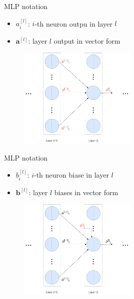\documentclass[compress,oilve,t]{beamer}
\begin{document}
\begin{frame}{MLP notation}
	\begin{itemize}
		\item $a^{[l]}_i$: $i$-th neuron outpu in layer $l$
		\item $\bm{a}^{[l]}$: layer $l$ output in vector form
	\end{itemize}
	\begin{figure}[H]
		\centering
		\includegraphics[width=0.5\textwidth]{Figs/notation1.png}
	\end{figure}
\end{frame}

\begin{frame}{MLP notation}
	\begin{itemize}
		\item $b^{[l]}_i$: $i$-th neuron biase in layer $l$
		\item $\bm{b}^{[l]}$: layer $l$ biases in vector form
	\end{itemize}
	\begin{figure}[H]
		\centering
		\includegraphics[width=0.5\textwidth]{Figs/notation1.2.png}
	\end{figure}
\end{frame}
\end{document}

